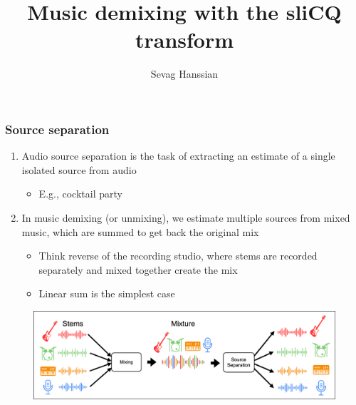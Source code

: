 \documentclass[usenames,dvipsnames]{beamer}
\title{Music demixing with the sliCQ transform}
\author{Sevag Hanssian}
\date{}
\begin{document}
\begin{frame}
\maketitle
\end{frame}

\begin{frame}
	\frametitle{Source separation}
	\begin{enumerate}
		\item
			Audio source separation is the task of extracting an estimate of a single isolated source from audio
			\begin{itemize}
				\item
					E.g., cocktail party
			\end{itemize}
		\item
			In music demixing (or unmixing), we estimate multiple sources from mixed music, which are summed to get back the original mix
			\begin{itemize}
				\item
					Think reverse of the recording studio, where stems are recorded separately and mixed together create the mix
				\item
					Linear sum is the simplest case
			\end{itemize}
	\end{enumerate}
	\begin{figure}[ht]
		\centering
		\vspace{-0.5em}
		\includegraphics[width=\textwidth]{./images-mss/mixdemix.png}
	\end{figure}
\end{frame}
\end{document}
